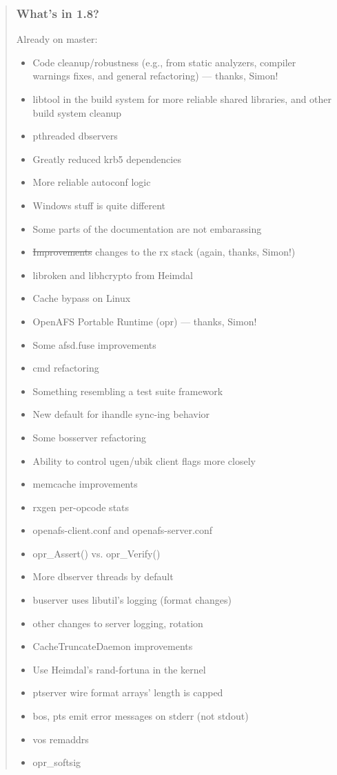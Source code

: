 \documentclass{beamer}
\begin{document}
\begin{frame}[fragile]
\begin{quote}
\begin{frame}
\frametitle{What's in 1.8?}
Already on master:
\begin{itemize}
\item{Code cleanup/robustness (e.g., from static analyzers, compiler
warnings fixes, and general refactoring) --- thanks, Simon!}
\item{libtool in the build system for more reliable shared libraries,
and other build system cleanup}
\item{pthreaded dbservers}
\item{Greatly reduced krb5 dependencies}
\item{More reliable autoconf logic}
\item{Windows stuff is quite different}
\item{Some parts of the documentation are not embarassing}
\item{\sout{Improvements} changes to the rx stack (again, thanks, Simon!)}
\item{libroken and libhcrypto from Heimdal}
\item{Cache bypass on Linux}
\item{OpenAFS Portable Runtime (opr) --- thanks, Simon!}
\item{Some afsd.fuse improvements}
\item{cmd refactoring}
\item{Something resembling a test suite framework}
\item{New default for ihandle sync-ing behavior}
\item{Some bosserver refactoring}
\item{Ability to control ugen/ubik client flags more closely}
\item{memcache improvements}
\item{rxgen per-opcode stats}
\item{openafs-client.conf and openafs-server.conf}
\item{opr_Assert() vs. opr_Verify()}
\item{More dbserver threads by default}
\item{buserver uses libutil's logging (format changes)}
\item{other changes to server logging, rotation}
\item{CacheTruncateDaemon improvements}
\item{Use Heimdal's rand-fortuna in the kernel}
\item{ptserver wire format arrays' length is capped}
\item{bos, pts emit error messages on stderr (not stdout)}
\item{vos remaddrs}
\item{opr_softsig}
\end{itemize}
\end{frame}


\end{quote}
\end{frame}
\end{document}
